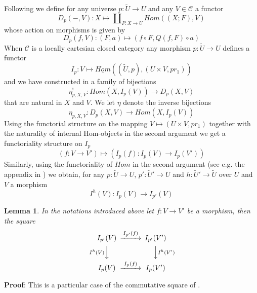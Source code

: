 \documentclass[12pt]{article}
\newenvironment{myproof}{{\bf Proof}:}{\vskip 5mm }
\newtheorem{lemma}[proposition]{Lemma}
\newcommand{\llabel}[1]{\label{#1}}
\newcommand{\sr}{\rightarrow}
\newcommand{\uu}{\underline}
\newcommand{\wt}{\widetilde}
\begin{document}
Following \cite{fromunivwithPi} we define for any universe $p:\wt{U}\sr U$ and any $V\in {\mathcal C}$ a functor
%
$$D_p(-,V):X\mapsto \amalg_{F:X\sr U}Hom((X;F), V)$$
%
whose action on morphisms is given by
%
$$D_p(f,V):(F,a)\mapsto (f\circ F, Q(f,F)\circ a)$$
%
When $\mathcal C$ is a locally cartesian closed category any morphism $p:\wt{U}\sr U$ defines a functor
%
$$I_p:V\mapsto \uu{Hom}((\wt{U},p),(U\times V,pr_1))$$
%
and we have constructed in \cite[Construction 3.9]{fromunivwithPi} a family of bijections
%
$$\eta^!_{p,X,V}:Hom(X,I_p(V))\sr D_p(X,V)$$
%
that are natural in $X$ and $V$. We let $\eta$ denote the inverse bijections 
%
$$\eta_{p,X,V}:D_p(X,V)\sr Hom(X,I_p(V))$$
%
Using the functorial structure on the mapping $V\mapsto (U\times V,pr_1)$ together with the naturality of internal Hom-objects in the second argument we get a functoriality structure on $I_p$
%
$$(f:V\sr V')\mapsto (I_p(f):I_p(V)\sr I_p(V'))$$
%
Similarly, using the functoriality of $\uu{Hom}$ in the second argument (see e.g. the appendix in \cite{fromunivwithPi}) we obtain, for any $p:\wt{U}\sr U$, $p':\wt{U}'\sr U$ and $h:\wt{U}'\sr \wt{U}$ over $U$ and $V$ a morphism
%
$$I^h(V):I_p(V)\sr I_{p'}(V)$$
%
\begin{lemma}
\llabel{2015.04.10.l2}
In the notations introduced above let $f:V\sr V'$ be a morphism, then the square
%
$$
\begin{CD}
I_{p'}(V) @>I_{p'}(f)>> I_{p'}(V')\\
@V{I^h(V)}VV @VV{I^h(V')}V\\
I_p(V) @>I_p(f)>> I_p(V')
\end{CD}
$$
\end{lemma}
%
\begin{myproof}
This is a particular case of the commutative square of \cite[Lemma 8.5]{fromunivwithPi}.
\end{myproof}
\end{document}
